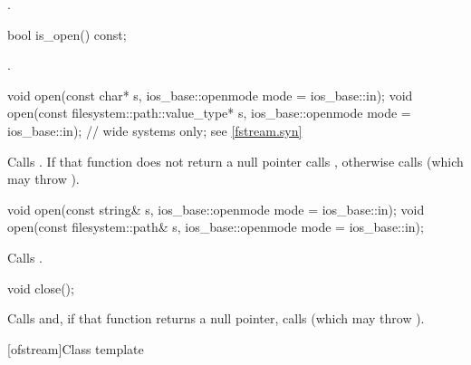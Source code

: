 \begin{itemdescr}
\pnum
\returns
{}.
\end{itemdescr}

%
\begin{itemdecl}
bool is_open() const;
\end{itemdecl}

\begin{itemdescr}
\pnum
\returns
{}.
\end{itemdescr}

%
\begin{itemdecl}
void open(const char* s, ios_base::openmode mode = ios_base::in);
void open(const filesystem::path::value_type* s,
          ios_base::openmode mode = ios_base::in);  // wide systems only; see \ref{fstream.syn}
\end{itemdecl}

\begin{itemdescr}
\pnum
\effects
Calls
.
If that function does not return a null pointer
calls ,
otherwise calls
(which may throw
).
\end{itemdescr}

%
\begin{itemdecl}
void open(const string& s, ios_base::openmode mode = ios_base::in);
void open(const filesystem::path& s, ios_base::openmode mode = ios_base::in);
\end{itemdecl}

\begin{itemdescr}
\pnum
\effects Calls .
\end{itemdescr}

%
\begin{itemdecl}
void close();
\end{itemdecl}

\begin{itemdescr}
\pnum
\effects
Calls
and, if that function returns
a null pointer,
calls
(which may throw
).
\end{itemdescr}

[ofstream]{Class template }

